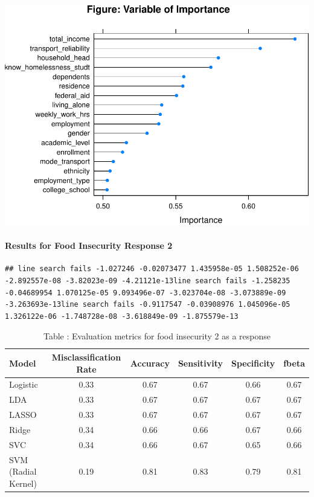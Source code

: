 \documentclass[
  10pt,
]{article}
\begin{document}
\includegraphics{phase1_report_files/figure-latex/unnamed-chunk-11-1}

\hypertarget{results-for-food-insecurity-response-2}{%
\paragraph{Results for Food Insecurity Response 2}\label{results-for-food-insecurity-response-2}}

\begin{verbatim}
## line search fails -1.027246 -0.02073477 1.435958e-05 1.508252e-06 -2.892557e-08 -3.82023e-09 -4.21121e-13line search fails -1.258235 -0.04689954 1.070125e-05 9.093496e-07 -3.023704e-08 -3.073889e-09 -3.263693e-13line search fails -0.9117547 -0.03908976 1.045096e-05 1.326122e-06 -1.748728e-08 -3.618849e-09 -1.875579e-13
\end{verbatim}

\begin{table}[H]

\caption{\label{tab:unnamed-chunk-12}Table : Evaluation metrics for  food insecurity 2 as a response}
\centering
\fontsize{12}{14}\selectfont
\begin{tabular}[t]{l|c|c|c|c|c}
\hline
Model & Misclassification Rate & Accuracy & Sensitivity & Specificity & fbeta\\
\hline
Logistic & 0.33 & 0.67 & 0.67 & 0.66 & 0.67\\
\hline
LDA & 0.33 & 0.67 & 0.67 & 0.67 & 0.67\\
\hline
LASSO & 0.33 & 0.67 & 0.67 & 0.67 & 0.67\\
\hline
Ridge & 0.34 & 0.66 & 0.66 & 0.67 & 0.66\\
\hline
SVC & 0.34 & 0.66 & 0.67 & 0.65 & 0.66\\
\hline
SVM (Radial Kernel) & 0.19 & 0.81 & 0.83 & 0.79 & 0.81\\
\hline
\end{tabular}
\end{table}
\end{document}
